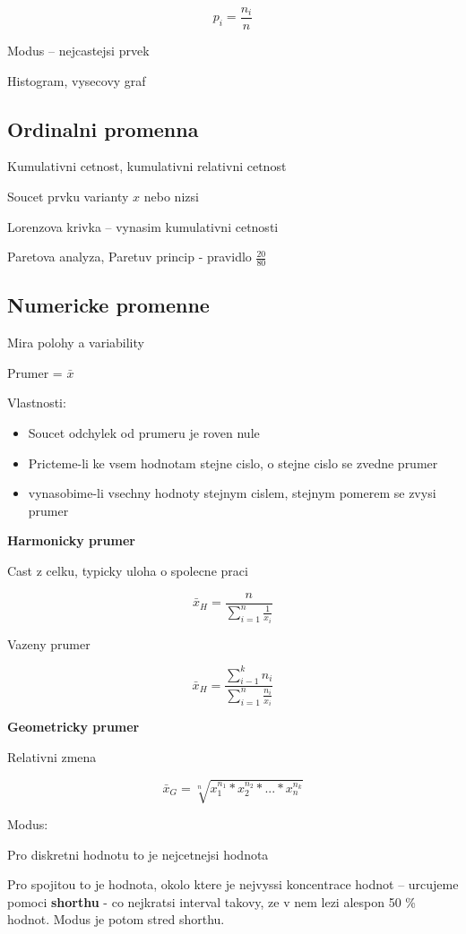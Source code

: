 \documentclass{article}
\begin{document}
\[ p_i = \frac{n_i}{n} \]

Modus -- nejcastejsi prvek

Histogram, vysecovy graf

\subsection{Ordinalni promenna}

Kumulativni cetnost, kumulativni relativni cetnost

Soucet prvku varianty $x$ nebo nizsi

Lorenzova krivka -- vynasim kumulativni cetnosti

Paretova analyza, Paretuv princip - pravidlo $\frac {20} {80}$

\subsection{Numericke promenne}

Mira polohy a variability

Prumer = $\bar{x}$

Vlastnosti:
\begin{itemize}
    \item Soucet odchylek od prumeru je roven nule
    \item Pricteme-li ke vsem hodnotam stejne cislo, o stejne cislo se zvedne prumer
    \item vynasobime-li vsechny hodnoty stejnym cislem, stejnym pomerem se zvysi prumer
\end{itemize}

\textbf{Harmonicky prumer}

Cast z celku, typicky uloha o spolecne praci

\[ \bar{x}_H = \frac {n} { \sum_{i=1}^n \frac{1}{x_i} } \]

Vazeny prumer

\[ \bar{x}_H = \frac { \sum_{i-1}^k n_i } { \sum_{i=1}^n \frac{n_i}{x_i} } \]

\textbf{Geometricky prumer}

Relativni zmena

\[ \bar{x}_G = \sqrt[n]{ x^{n_1}_1 * x^{n_2}_2 * ... * x^{n_k}_n } \]

Modus:

Pro diskretni hodnotu to je nejcetnejsi hodnota

Pro spojitou to je hodnota, okolo ktere je nejvyssi koncentrace hodnot --
urcujeme pomoci \textbf{shorthu} - co nejkratsi interval takovy, ze v nem lezi
alespon 50 \% hodnot. Modus je potom stred shorthu.
\end{document}
